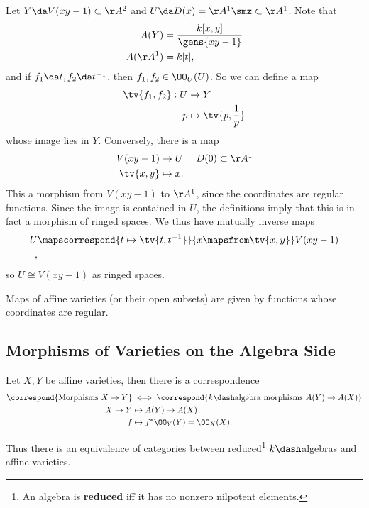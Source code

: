\begin{example}

Let \(Y \da V(xy-1) \subset\AA^2\) and
\(U\da D(x) = \AA^1\smz \subset \AA^1\). Note that
\begin{align*}  
A(Y)    &= {k[x, y] \over \gens{xy-1}} \\
A(\AA^1) &= k[t]
,\end{align*} and if \(f_1 \da t, f_2\da t^{-1}\), then
\(f_1, f_2 \in \OO_U(U)\). So we can define a map
\begin{align*}  
\tv{f_1, f_2}: U &\to Y  \\
p &\mapsto \tv{p, {1\over p} }
\end{align*} whose image lies in \(Y\). Conversely, there is a map
\begin{align*}  
V(xy - 1) &\to U = D(0) \subset  \AA^1 \\
\tv{x, y} &\mapsto x
.\end{align*} This a morphism from \(V(xy - 1)\) to \(\AA^1\), since the
coordinates are regular functions. Since the image is contained in
\(U\), the definitions imply that this is in fact a morphism of ringed
spaces. We thus have mutually inverse maps
\begin{align*}  
U       &\mapscorrespond{t\mapsto \tv{t, t^{-1} }}{x\mapsfrom \tv{x, y}} V(xy-1) \\ 
,\end{align*} so \(U\cong V(xy-1)\) as ringed spaces.

\end{example}

\begin{slogan}

Maps of affine varieties (or their open subsets) are given by functions
whose coordinates are regular.

\end{slogan}

\hypertarget{morphisms-of-varieties-on-the-algebra-side}{%
\subsection{Morphisms of Varieties on the Algebra
Side}\label{morphisms-of-varieties-on-the-algebra-side}}

\begin{corollary}

Let \(X, Y\) be affine varieties, then there is a correspondence
\begin{align*}  
\correspond{\text{Morphisms } X\to Y }
&\iff
\correspond{k\dash\text{algebra morphisms } A(Y) \to A(X)} \\
X\to Y &\mapsto A(Y) \to A(X) \\
f &\mapsto f^* \OO_Y(Y) = \OO_X(X)
.\end{align*}

Thus there is an equivalence of categories between reduced\footnote{An
  algebra is \textbf{reduced} iff it has no nonzero nilpotent elements.}
\(k\dash\)algebras and affine varieties.

\end{corollary}

